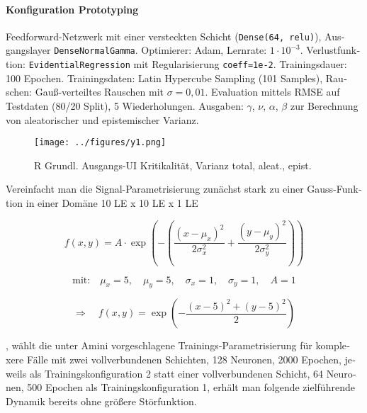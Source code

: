 \begin{otherlanguage}{ngerman}




\paragraph{Konfiguration \glqq Prototyping \grqq} Feedforward-Netzwerk mit einer versteckten Schicht (\texttt{Dense(64, relu)}), Ausgangslayer \texttt{DenseNormalGamma}. Optimierer: Adam, Lernrate: $1\cdot10^{-3}$. Verlustfunktion: \texttt{EvidentialRegression} mit Regularisierung \texttt{coeff=1e-2}. Trainingsdauer: 100 Epochen. Trainingsdaten: Latin Hypercube Sampling (101 Samples), Rauschen: Gauß-verteiltes Rauschen mit $\sigma = 0{,}01$. Evaluation mittels RMSE auf Testdaten (80/20 Split), 5 Wiederholungen. Ausgaben: $\gamma$, $\nu$, $\alpha$, $\beta$ zur Berechnung von aleatorischer und epistemischer Varianz.

\begin{figure}[!ht]
  \centering
  \texttt{[image: ../figures/y1.png]}
  \caption{R Grundl. Ausgangs-UI Kritikalität, Varianz total, aleat., epist.}
\end{figure}

Vereinfacht man die Signal-Parametrisierung zunächst stark zu einer Gauss-Funktion in einer Domäne 10 LE x 10 LE x 1 LE

\[
f(x, y) = A \cdot \exp\left( -\left( \frac{(x - \mu_x)^2}{2\sigma_x^2} + \frac{(y - \mu_y)^2}{2\sigma_y^2} \right) \right)
\]

\[
\text{mit:} \quad \mu_x = 5,\quad \mu_y = 5,\quad \sigma_x = 1,\quad \sigma_y = 1,\quad A = 1
\]

\[
\Rightarrow \quad f(x, y) = \exp\left( -\frac{(x - 5)^2 + (y - 5)^2}{2} \right)
\]

, wählt die unter Amini vorgeschlagene Trainings-Parametrisierung für komplexere Fälle mit zwei vollverbundenen Schichten, 128 Neuronen, 2000 Epochen, jeweils als Trainingskonfiguration 2 statt einer vollverbundenen Schicht, 64 Neuronen, 500 Epochen als Trainingskonfiguration 1, erhält man folgende zielführende Dynamik bereits ohne größere Störfunktion. 




\end{otherlanguage}
